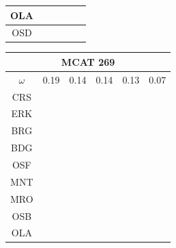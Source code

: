 \documentclass[12pt]{article}
\begin{document}
\begin{landscape}
\begin{figure}
{\begin{minipage}[c]{0.3\textwidth}
\begin{tabular}{|c|c|c|c|c|c|}
        OLA&\cellcolor[HTML]{984EA3}&\cellcolor[HTML]{FF7F00}&\cellcolor[HTML]{FFFF33}&\cellcolor[HTML]{FFFF33}&\cellcolor[HTML]{984EA3}\\ \hline %
        OSD&\cellcolor[HTML]{FF7F00}&\cellcolor[HTML]{FF7F00}&\cellcolor[HTML]{FFFF33}&\cellcolor[HTML]{FFFF33}&\cellcolor[HTML]{FF7F00}\\ \hline %
\end{tabular}
\end{minipage}
\begin{minipage}[c]{0.3\textwidth}
\hspace*{-2.5cm}
\begin{tabular}{|c|c|c|c|c|c|}%
         \hline \multicolumn{6}{|c|}{MCAT 269} \\ \hline
         $\omega$&0.19&0.14&0.14&0.13&0.07\\ \hline %
        CRS&\cellcolor[HTML]{E41A1C}&\cellcolor[HTML]{E41A1C}&\cellcolor[HTML]{E41A1C}&\cellcolor[HTML]{E41A1C}&\cellcolor[HTML]{E41A1C}\\ \hline %
        ERK&\cellcolor[HTML]{E41A1C}&\cellcolor[HTML]{E41A1C}&\cellcolor[HTML]{E41A1C}&\cellcolor[HTML]{E41A1C}&\cellcolor[HTML]{E41A1C}\\ \hline %
        BRG&\cellcolor[HTML]{E41A1C}&\cellcolor[HTML]{E41A1C}&\cellcolor[HTML]{E41A1C}&\cellcolor[HTML]{E41A1C}&\cellcolor[HTML]{E41A1C}\\ \hline %
        BDG&\cellcolor[HTML]{377EB8}&\cellcolor[HTML]{377EB8}&\cellcolor[HTML]{377EB8}&\cellcolor[HTML]{377EB8}&\cellcolor[HTML]{377EB8}\\ \hline %
        OSF&\cellcolor[HTML]{377EB8}&\cellcolor[HTML]{377EB8}&\cellcolor[HTML]{377EB8}&\cellcolor[HTML]{377EB8}&\cellcolor[HTML]{377EB8}\\ \hline %
        MNT&\cellcolor[HTML]{377EB8}&\cellcolor[HTML]{377EB8}&\cellcolor[HTML]{377EB8}&\cellcolor[HTML]{377EB8}&\cellcolor[HTML]{377EB8}\\ \hline %
        MRO&\cellcolor[HTML]{4DAF4A}&\cellcolor[HTML]{4DAF4A}&\cellcolor[HTML]{4DAF4A}&\cellcolor[HTML]{4DAF4A}&\cellcolor[HTML]{4DAF4A}\\ \hline %
        OSB&\cellcolor[HTML]{984EA3}&\cellcolor[HTML]{984EA3}&\cellcolor[HTML]{984EA3}&\cellcolor[HTML]{4DAF4A}&\cellcolor[HTML]{4DAF4A}\\ \hline %
        OLA&\cellcolor[HTML]{FF7F00}&\cellcolor[HTML]{984EA3}&\cellcolor[HTML]{FF7F00}&\cellcolor[HTML]{984EA3}&\cellcolor[HTML]{984EA3}\\ \hline %

\end{tabular}
\end{minipage}}
\end{figure}
\end{landscape}
\end{document}
